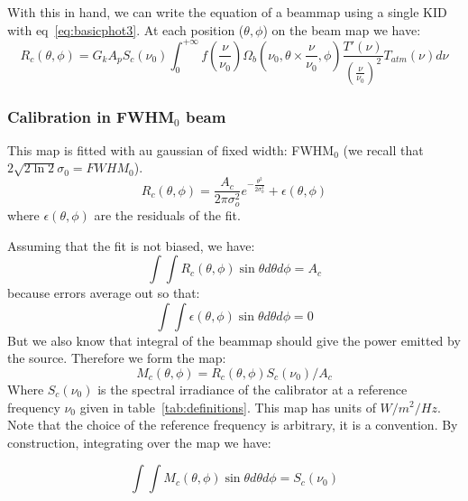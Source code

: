 With this in hand, we can write the equation of a beammap using a
single KID with eq~\ref{eq:basicphot3}. At each position ($\theta,
\phi$) on the beam map we have:
\begin{equation}
R_{c}(\theta, \phi) =  G_{k} A_{p} S_{c} (\nu_{0})  \int_{0}^{+\infty}
f(\frac{\nu}{\nu_{0}}) \Omega_{b}(\nu_{0}, \theta \times \frac{\nu}{\nu_{0}},
\phi) \frac{T'(\nu)}{\left(\frac{\nu}{\nu_{0}}\right)^{2}}
T_{atm}(\nu) d\nu
\label{eq:beammap}
\end{equation}

\subsubsection{Calibration in FWHM$_{0}$ beam}

This map is fitted with au gaussian of fixed width: FWHM$_{0}$ (we
recall that $2 \sqrt{2\ln{2}} \sigma_{0} =  FWHM_{0}$).
\begin{equation} 
R_{c}(\theta, \phi) = \frac{A_{c}}{2 \pi \sigma_{o}^{2}}
e^{-\frac{\theta^{2}}{2\sigma_{0}^{2}}}  + \epsilon(\theta, \phi)
\end{equation}
where $\epsilon(\theta, \phi)$ are the residuals of the fit.

Assuming that the fit is not biased, we have:
\begin{equation} 
\int\int R_{c}(\theta, \phi) \sin \theta d\theta d\phi = A_{c}
\end{equation}
because errors average out so that:
\begin{equation} 
\int\int \epsilon (\theta, \phi) \sin \theta d\theta d\phi = 0
\end{equation}
But we also know that integral of the beammap should give the power
emitted by the source. Therefore we form the map:
\begin{equation}
M_{c}(\theta, \phi) = R_{c}(\theta, \phi)   S_{c} (\nu_{0}) / A_{c}
\end{equation}
Where  $S_{c} (\nu_{0})$ is the spectral irradiance of the calibrator
at a reference frequency $\nu_{0}$ given in
table~\ref{tab:definitions}. This map has units of $W/m^{2}/Hz$. Note
that the choice of the reference frequency is arbitrary, it is a
convention. By construction, integrating over the map we have:

\begin{equation}
\int\int M_{c}(\theta, \phi) \sin \theta d\theta d\phi = S_{c}(\nu_{0})
\end{equation}



